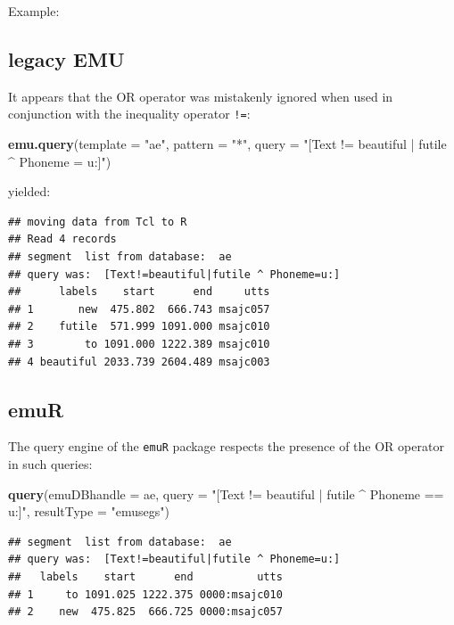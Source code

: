 \documentclass[]{book}
\newenvironment{Shaded}{\begin{snugshade}}{\end{snugshade}}
\newcommand{\DataTypeTok}[1]{\textcolor[rgb]{0.13,0.29,0.53}{#1}}
\newcommand{\KeywordTok}[1]{\textcolor[rgb]{0.13,0.29,0.53}{\textbf{#1}}}
\newcommand{\NormalTok}[1]{#1}
\newcommand{\StringTok}[1]{\textcolor[rgb]{0.31,0.60,0.02}{#1}}
\begin{document}
Example:

\hypertarget{legacy-emu-1}{%
\subsection{legacy EMU}\label{legacy-emu-1}}

It appears that the OR operator \texttt{\textbar{}} was mistakenly ignored when used in conjunction with the inequality operator \texttt{!=}:

\begin{Shaded}
\begin{Highlighting}[]
\KeywordTok{emu.query}\NormalTok{(}\DataTypeTok{template =} \StringTok{"ae"}\NormalTok{,}
          \DataTypeTok{pattern =} \StringTok{"*"}\NormalTok{,}
          \DataTypeTok{query =} \StringTok{"[Text != beautiful | futile ^ Phoneme = u:]"}\NormalTok{)}
\end{Highlighting}
\end{Shaded}

yielded:

\begin{verbatim}
## moving data from Tcl to R
## Read 4 records
## segment  list from database:  ae
## query was:  [Text!=beautiful|futile ^ Phoneme=u:]
##      labels    start      end     utts
## 1       new  475.802  666.743 msajc057
## 2    futile  571.999 1091.000 msajc010
## 3        to 1091.000 1222.389 msajc010
## 4 beautiful 2033.739 2604.489 msajc003
\end{verbatim}

\hypertarget{emur-1}{%
\subsection{emuR}\label{emur-1}}

The query engine of the \texttt{emuR} package respects the presence of the OR operator in such queries:

\begin{Shaded}
\begin{Highlighting}[]
\KeywordTok{query}\NormalTok{(}\DataTypeTok{emuDBhandle =}\NormalTok{ ae,}
      \DataTypeTok{query =} \StringTok{"[Text != beautiful | futile ^ Phoneme == u:]"}\NormalTok{,}
      \DataTypeTok{resultType =} \StringTok{"emusegs"}\NormalTok{)}
\end{Highlighting}
\end{Shaded}

\begin{verbatim}
## segment  list from database:  ae
## query was:  [Text!=beautiful|futile ^ Phoneme=u:]
##   labels    start      end          utts
## 1     to 1091.025 1222.375 0000:msajc010
## 2    new  475.825  666.725 0000:msajc057
\end{verbatim}
\end{document}
